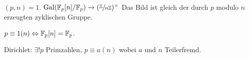 \begin{theorem}
	$(p,n) = 1$. $\operatorname{Gal}(\mathbb{F}_{p}[n] / \mathbb{F}_{p}) \to  (\sfrac{\mathbb{Z}}{n\mathbb{Z}})^{\times}$ 
	Das Bild ist gleich der durch $p$ modulo $n$ erzeugten zyklischen Gruppe.

	$p \equiv 1 (n) \Leftrightarrow \mathbb{F}_{p}[n] = \mathbb{F}_{p}$.
\end{theorem}

Dirichlet: $\exists! p $ Primzahlen, $p \equiv a (n)$ wobei $a$ und $n$ Teilerfremd.

























